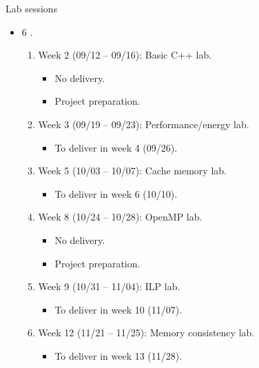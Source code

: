 \begin{frame}[t]{Lab sessions}
\begin{itemize}
  \item 6 .
    \begin{enumerate}
      \item Week 2 (09/12 -- 09/16): Basic C++ lab.
        \begin{itemize}
          \item No delivery.
          \item Project preparation.
        \end{itemize}
      \item Week 3 (09/19 -- 09/23): Performance/energy lab.
        \begin{itemize}
          \item To deliver in week 4 (09/26).
        \end{itemize}
      \item Week 5 (10/03 -- 10/07): Cache memory lab.
        \begin{itemize}
          \item To deliver in week 6 (10/10).
        \end{itemize}
      \item Week 8 (10/24 -- 10/28): OpenMP lab.
        \begin{itemize}
          \item No delivery.
          \item Project preparation.
        \end{itemize}
      \item Week 9 (10/31 -- 11/04): ILP lab.
        \begin{itemize}
          \item To deliver in week 10 (11/07).
        \end{itemize}
      \item Week 12 (11/21 -- 11/25): Memory consistency lab.
        \begin{itemize}
          \item To deliver in week 13 (11/28).
        \end{itemize}
    \end{enumerate}
\end{itemize}
\end{frame}

